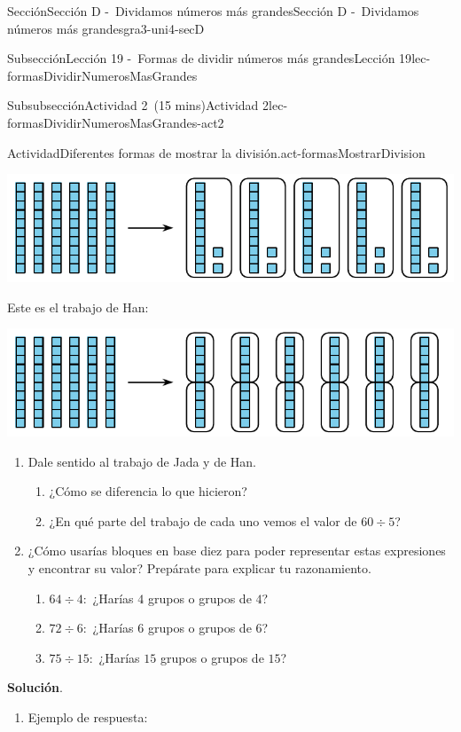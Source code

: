 \documentclass[oneside,10pt,]{article}
\newcommand{\blocktitlefont}{\relax}
\begin{document}
\begin{sectionptx}{Sección}{Sección D -~Dividamos números más grandes}{}{Sección D -~Dividamos números más grandes}{}{}{gra3-uni4-secD}
\begin{subsectionptx}{Subsección}{Lección 19 -~Formas de dividir números más grandes}{}{Lección 19}{}{}{lec-formasDividirNumerosMasGrandes}
\begin{subsubsectionptx}{Subsubsección}{Actividad 2~(15 mins)}{}{Actividad 2}{}{}{lec-formasDividirNumerosMasGrandes-act2}
\begin{activity}{Actividad}{Diferentes formas de mostrar la división.}{act-formasMostrarDivision}
\begin{image}{0}{1}{0}{}%
\includegraphics[width=\linewidth]{external/svg-source/tikz-file-152963-scale13.pdf}
\end{image}%
Este es el trabajo de Han:%
\begin{image}{0}{1}{0}{}%
\includegraphics[width=\linewidth]{external/svg-source/tikz-file-152964-scale13.pdf}
\end{image}%
%
\begin{enumerate}
\item{}Dale sentido al trabajo de Jada y de Han.%
%
\begin{enumerate}
\item{}¿Cómo se diferencia lo que hicieron?%
\item{}¿En qué parte del trabajo de cada uno vemos el valor de \(60 \div 5\)?%
\end{enumerate}
\item{}¿Cómo usarías bloques en base diez para poder representar estas expresiones y encontrar su valor? Prepárate para explicar tu razonamiento.%
%
\begin{enumerate}
\item{}\(64 \div 4:\) ¿Harías \(4\) grupos o grupos de \(4\)?%
\item{}\(72 \div 6:\) ¿Harías \(6\) grupos o grupos de \(6\)?%
\item{}\(75 \div 15:\) ¿Harías \(15\) grupos o grupos de \(15\)?%
\end{enumerate}
\end{enumerate}
\par\smallskip%
\noindent\textbf{\blocktitlefont Solución}.\hypertarget{act-formasMostrarDivision-3}{}\quad{}%
\begin{enumerate}
\item{}Ejemplo de respuesta:%
%
\begin{enumerate}

\end{enumerate}
\end{enumerate}
\end{activity}
\end{subsubsectionptx}
\end{subsectionptx}
\end{sectionptx}
\end{document}
